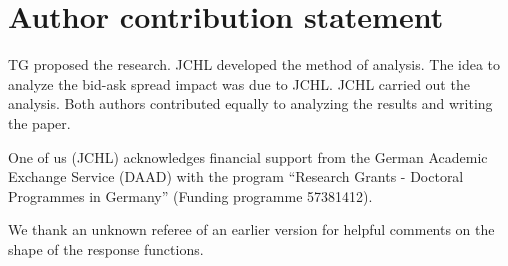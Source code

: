 \section{Author contribution statement}

TG proposed the research. JCHL developed the method of analysis. The idea to
analyze the bid-ask spread impact was due to JCHL. JCHL carried out the
analysis. Both authors contributed equally to analyzing the results and writing
the paper.

One of us (JCHL) acknowledges financial support from the German Academic
Exchange Service (DAAD) with the program ``Research Grants - Doctoral
Programmes in Germany'' (Funding programme 57381412).

We thank an unknown referee of an earlier version for helpful comments on the
shape of the response functions.


